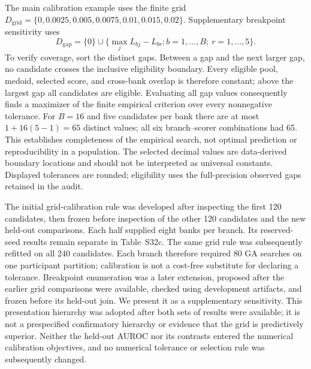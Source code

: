 The main calibration example uses the finite grid $D_{\mathrm{grid}}=\{0,0.0025,0.005,0.0075,0.01,0.015,0.02\}$. Supplementary breakpoint sensitivity uses
\begin{equation}
D_{\mathrm{gap}}=\{0\}\cup\{\max_j L_{bj}-L_{br}:b=1,\ldots,B;\ r=1,\ldots,5\}.
\end{equation}
To verify coverage, sort the distinct gaps. Between a gap and the next larger gap, no candidate crosses the inclusive eligibility boundary. Every eligible pool, medoid, selected score, and cross-bank overlap is therefore constant; above the largest gap all candidates are eligible. Evaluating all gap values consequently finds a maximizer of the finite empirical criterion over every nonnegative tolerance. For $B=16$ and five candidates per bank there are at most $1+16(5-1)=65$ distinct values; all six branch--scorer combinations had 65. This establishes completeness of the empirical search, not optimal prediction or reproducibility in a population. The selected decimal values are data-derived boundary locations and should not be interpreted as universal constants. Displayed tolerances are rounded; eligibility uses the full-precision observed gaps retained in the audit.

The initial grid-calibration rule was developed after inspecting the first 120 candidates, then frozen before inspection of the other 120 candidates and the new held-out comparisons. Each half supplied eight banks per branch. Its reserved-seed results remain separate in Table~S32c. The same grid rule was subsequently refitted on all 240 candidates. Each branch therefore required 80 GA searches on one participant partition; calibration is not a cost-free substitute for declaring a tolerance. Breakpoint enumeration was a later extension, proposed after the earlier grid comparisons were available, checked using development artifacts, and frozen before its held-out join. We present it as a supplementary sensitivity. This presentation hierarchy was adopted after both sets of results were available; it is not a prespecified confirmatory hierarchy or evidence that the grid is predictively superior. Neither the held-out AUROC nor its contrasts entered the numerical calibration objectives, and no numerical tolerance or selection rule was subsequently changed.

